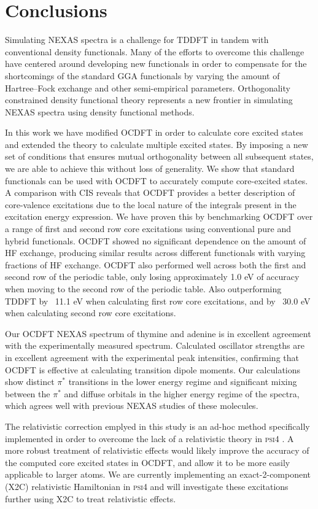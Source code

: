 \documentclass[12pt]{article}
\begin{document}
\section{Conclusions}
Simulating NEXAS spectra is a challenge for TDDFT in tandem with conventional density functionals. Many of the efforts to overcome this challenge have centered around developing new functionals in order to compensate for the shortcomings of the standard GGA functionals by varying the amount of Hartree--Fock exchange and other semi-empirical parameters.
Orthogonality constrained density functional theory represents a new frontier in simulating NEXAS spectra using density functional methods.

In this work we have modified OCDFT in order to calculate core excited states and extended the theory to calculate multiple excited states. By imposing a new set of conditions that ensures mutual orthogonality between all subsequent states, we are able to achieve this without loss of generality. We show that standard functionals can be used with OCDFT to accurately compute core-excited states. A comparison with CIS reveals  that OCDFT provides a better description of core-valence excitations due to the local nature of the integrals present in the excitation energy expression. We have proven this by benchmarking OCDFT over a range of first and second row core excitations using conventional pure and hybrid functionals. OCDFT showed no significant dependence on the amount of HF exchange, producing similar results across different functionals with varying fractions of HF exchange. OCDFT also performed well across both the first and second row of the periodic table, only losing approximately 1.0 eV of accuracy when moving to the second row of the periodic table. Also outperforming TDDFT by ~11.1 eV when calculating first row core excitations, and by ~30.0 eV when calculating second row core excitations.

Our OCDFT NEXAS spectrum of thymine and adenine is in excellent agreement with the experimentally measured spectrum. Calculated oscillator strengths are in excellent agreement with the experimental peak intensities, confirming that OCDFT is effective at calculating transition dipole moments. Our calculations show distinct $\pi^*$ transitions in the lower energy regime and significant mixing between the $\pi^*$ and diffuse orbitals in the higher energy regime of the spectra, which agrees well with previous NEXAS studies of these molecules.

The relativistic correction emplyed in this study is an ad-hoc method specifically implemented in order to overcome the lack of a relativistic theory in \textsc{psi4} . A more robust treatment of relativistic effects would likely improve the accuracy of the computed core excited states in OCDFT, and allow it to be more easily applicable to larger atoms. We are currently implementing an exact-2-component (X2C) relativistic Hamiltonian in \textsc{psi4}  and will investigate these excitations further using X2C to treat relativistic effects. 
\end{document}
